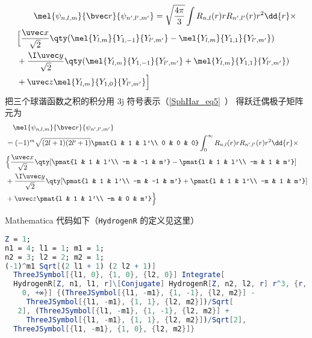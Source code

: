 \begin{equation}
\begin{aligned}
&\qquad \mel{\psi_{n,l,m}}{\bvec r}{\psi_{n',l',m'}}
= \sqrt{\frac{4\pi}{3}}\int R_{n,l}(r) r R_{n',l'}(r) r^2 \dd{r}\times\\
&\Big[\frac{\uvec x}{\sqrt 2} \qty(\mel{Y_{l,m}}{Y_{1,-1}}{Y_{l',m'}} - \mel{Y_{l,m}}{Y_{1,1}}{Y_{l',m'}})\\
&+ \frac{\I \uvec y}{\sqrt 2} \qty(\mel{Y_{l,m}}{Y_{1,-1}}{Y_{l',m'}} + \mel{Y_{l,m}}{Y_{1,1}}{Y_{l',m'}})\\
&+ \uvec z\mel{Y_{l,m}}{Y_{1,0}}{Y_{l',m'}}\Big]
\end{aligned}
\end{equation}
把三个球谐函数之积的积分用 3j 符号表示（\autoref{SphHar_eq5}~） 得跃迁偶极子矩阵元为
\begin{equation}
\begin{aligned}
&\quad\mel{\psi_{n,l,m}}{\bvec r}{\psi_{n',l',m'}}\\
&= (-1)^m\sqrt{(2l+1)(2l'+1)} \pmat{l & 1 & l'\\ 0 & 0 & 0} \int_0^\infty R_{n,l}(r) r R_{n',l'}(r) r^2 \dd{r}\times\\
&\Big\{\frac{\uvec x}{\sqrt 2} \qty[\pmat{l & 1 & l'\\ -m & -1 & m'} - \pmat{l & 1 & l'\\ -m & 1 & m'}]\\
&+ \frac{\I \uvec y}{\sqrt 2} \qty[\pmat{l & 1 & l'\\ -m & -1 & m'} + \pmat{l & 1 & l'\\ -m & 1 & m'}]\\
&+  \uvec z \pmat{l & 1 & l'\\ -m & 0 & m'}\Big\}
\end{aligned}
\end{equation}

Mathematica 代码如下（\verb|HydrogenR| 的定义见这里）
\begin{lstlisting}[language=Mathematica]
Z = 1;
n1 = 4; l1 = 1; m1 = 1;
n2 = 3; l2 = 2; m2 = 1;
(-1)^m1 Sqrt[(2 l1 + 1) (2 l2 + 1)]
  ThreeJSymbol[{l1, 0}, {1, 0}, {l2, 0}] Integrate[
  HydrogenR[Z, n1, l1, r]\[Conjugate] HydrogenR[Z, n2, l2, r] r^3, {r,
    0, +∞}] {(ThreeJSymbol[{l1, -m1}, {1, -1}, {l2, m2}] - 
     ThreeJSymbol[{l1, -m1}, {1, 1}, {l2, m2}])/Sqrt[
   2], (ThreeJSymbol[{l1, -m1}, {1, -1}, {l2, m2}] + 
     ThreeJSymbol[{l1, -m1}, {1, 1}, {l2, m2}])/Sqrt[2], 
  ThreeJSymbol[{l1, -m1}, {1, 0}, {l2, m2}]}
\end{lstlisting}

